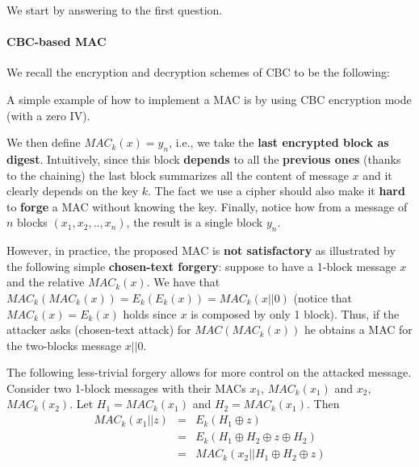 We start by answering to the first question.

\paragraph{CBC-based MAC}

We recall the encryption and decryption schemes of CBC to be the following:



A simple example of how to implement a MAC is by using CBC encryption mode (with a zero IV).


We then define $\mathit{MAC}_k(x) = y_n$, i.e., we take the \textbf{last encrypted block as digest}. Intuitively, since this block \textbf{depends} to all the \textbf{previous ones} (thanks to the chaining) the last block summarizes all the content of message $x$ and it clearly depends on the key $k$. The fact we use a cipher should also make it \textbf{hard} to \textbf{forge} a MAC without knowing the key. Finally, notice how from a message of $n$ blocks $(x_1, x_2, .., x_n)$, the result is a single block $y_n$.

However, in practice, the proposed MAC is \textbf{not satisfactory} as illustrated by the following simple \textbf{chosen-text forgery}: suppose to have a 1-block message $x$ and the relative $\mathit{MAC}_k(x)$. We have that $\mathit{MAC}_k(\mathit{MAC}_k(x)) = E_k(E_k(x)) = \mathit{MAC}_k(x || 0)$ (notice that $\mathit{MAC}_k(x) = E_k(x)$ holds since $x$ is composed by only 1 block). Thus, if the attacker asks (chosen-text attack) for $\mathit{MAC}(\mathit{MAC}_k(x))$ he obtains a MAC for the two-blocks message $x || 0$.


The following less-trivial forgery allows for more control on the attacked message. Consider two 1-block messages with their MACs $x_1$, $\mathit{MAC}_k(x_1)$ and $x_2$, $\mathit{MAC}_k(x_2)$. Let $H_1 =\mathit{MAC}_k(x_1)$  and $H_2 = \mathit{MAC}_k(x_1)$. Then
$$\begin{array}{rcl} \mathit{MAC}_k(x_1 || z) & = & E_k(H_1 \oplus z) \\ &= & E_k(H_1 \oplus H_2 \oplus z \oplus H_2) \\ &= &\mathit{MAC}_k(x_2 || H_1 \oplus H_2 \oplus z)\end{array}$$

